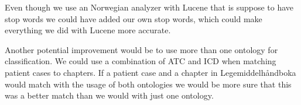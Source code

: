Even though we use an Norwegian analyzer with Lucene that is suppose to have
stop words we could have added our own stop words, which could make everything we
did with Lucene more accurate.

Another potential improvement would be to use more than one ontology for
classification. We could use a combination of ATC and ICD when matching patient
cases to chapters. If a patient case and a chapter in Legemiddelhåndboka would
match with the usage of both ontologies we would be more sure that this was a
better match than we would with just one ontology.


